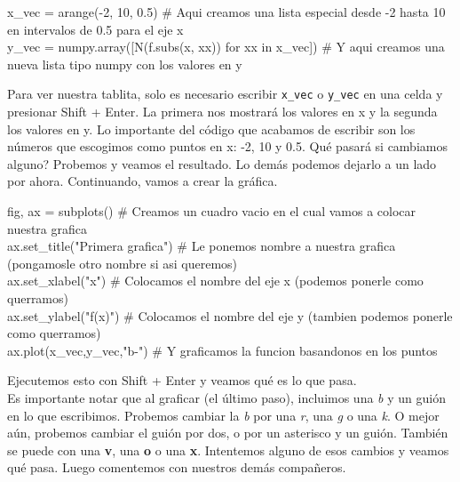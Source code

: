 \documentclass[10pt,letterpaper]{article}
\newcommand{\inlinecode}[1]{
\colorbox{light-gray}{\texttt{#1}}
}
\newenvironment{Code}
{
\begin{lrbox}{\selvestebox}%
\begin{minipage}{\dimexpr\columnwidth-2\fboxsep\relax}
\fontfamily{\ttdefault}\selectfont
}
{\end{minipage}\end{lrbox}%
\begin{center}
\colorbox{light-gray}{\usebox{\selvestebox}}
\end{center}
}
\begin{document}
\begin{footnotesize}
\begin{Code}
x\_vec = arange(-2, 10, 0.5) \# Aqui creamos una lista especial desde -2 hasta 10 en intervalos de 0.5 para el eje x\\
y\_vec = numpy.array([N(f.subs(x, xx)) for xx in x\_vec]) \# Y aqui creamos una nueva lista tipo numpy con los valores en y
\end{Code}
\end{footnotesize}

Para ver nuestra tablita, solo es necesario escribir \inlinecode{x\_vec} o \inlinecode{y\_vec} en una celda y presionar Shift + Enter. La primera nos mostrar\'a los valores en x y la segunda los valores en y. Lo importante del c\'odigo que acabamos de escribir son los n\'umeros que escogimos como puntos en x: -2, 10 y 0.5. Qu\'e pasar\'a si cambiamos alguno? Probemos y veamos el resultado. Lo dem\'as podemos dejarlo a un lado por ahora. Continuando, vamos a crear la gr\'afica.

\begin{footnotesize}
\begin{Code}
fig, ax = subplots() \# Creamos un cuadro vacio en el cual vamos a colocar nuestra grafica\\
ax.set\_title("Primera grafica") \# Le ponemos nombre a nuestra grafica (pongamosle otro nombre si asi queremos)\\
ax.set\_xlabel("x") \# Colocamos el nombre del eje x (podemos ponerle como querramos)\\
ax.set\_ylabel("f(x)") \# Colocamos el nombre del eje y (tambien podemos ponerle como querramos)\\
ax.plot(x\_vec,y\_vec,"b-") \# Y graficamos la funcion basandonos en los puntos
\end{Code}
\end{footnotesize}

Ejecutemos esto con Shift + Enter y veamos qu\'e es lo que pasa.\\

Es importante notar que al graficar (el \'ultimo paso), incluimos una \emph{b} y un gui\'on en lo que escribimos. Probemos cambiar la \emph{b} por una \emph{r}, una \emph{g} o una \emph{k}. O mejor a\'un, probemos cambiar el gui\'on por dos, o por un asterisco y un gui\'on. Tambi\'en se puede con una \textbf{v}, una \textbf{o} o una \textbf{x}. Intentemos alguno de esos cambios y veamos qu\'e pasa. Luego comentemos con nuestros dem\'as compa\~neros.\\
\end{document}
